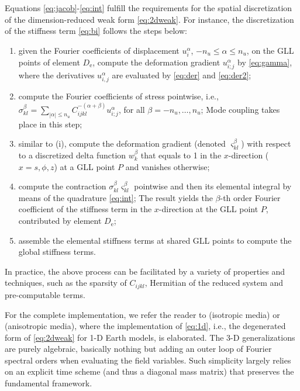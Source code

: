\documentclass[extra]{gji}
\begin{document}
Equations \eqref{eq:jacob}-\eqref{eq:int} fulfill
the requirements for the spatial discretization of the 
dimension-reduced weak form \eqref{eq:2dweak}. 
For instance, the discretization of the stiffness term \eqref{eq:bi} 
follows the steps below:
\begin{enumerate}
  \item given the Fourier coefficients of displacement 
  $u_i^\alpha$, $-n_u\le\alpha\le n_u$, 
  on the GLL points of element $D_\text{e}$, compute the deformation gradient 
  $u_{i;j}^\alpha$ by \eqref{eq:gamma},
  where the derivatives $u_{i,j}^\alpha$ are evaluated 
  by \eqref{eq:der} and \eqref{eq:der2}; 
  \item compute the Fourier coefficients of stress pointwise, i.e., $\sigma_{kl}^\beta=
  \sum_{|\alpha|\le n_u}C_{ijkl}^{-\left(\alpha+\beta\right)} u_{i;j}^\alpha$, 
  for all $\beta=-n_u,\dots, n_u$; Mode coupling takes place in this step;
  \item similar to (i), compute the deformation gradient (denoted $\varsigma_{kl}^\beta$) with respect to 
  a discretized delta function $w_k^\beta$ that equals to 1 in the $x$-direction  
  ($x=s,\phi,z$) at a GLL point $P$ and vanishes otherwise; 
  \item compute the contraction $\sigma_{kl}^\beta \varsigma_{kl}^\beta$ pointwise
  and then its elemental integral by means of the quadrature \eqref{eq:int}; 
  The result yields the $\beta$-th order Fourier coefficient of the
  stiffness term in the $x$-direction at the GLL point $P$,
  contributed by element $D_\text{e}$; 
  \item assemble the elemental stiffness terms at shared GLL points to compute
  the global stiffness terms.
\end{enumerate}
In practice, the above process can be facilitated by a variety of 
properties and techniques, such as the sparsity of $C_{ijkl}$,
Hermitian of the reduced system and pre-computable terms. 

For the complete implementation, we refer the reader to \cite{nissen2007sem} 
(isotropic media) or \cite{van2014seismic} (anisotropic media),
where the implementation of \eqref{eq:1d}, i.e.,
the degenerated form of \eqref{eq:2dweak} for 1-D Earth models,
is elaborated. The 3-D generalizations are purely algebraic, basically
nothing but adding an outer loop of Fourier spectral orders when evaluating the
field variables. Such simplicity largely relies on
an explicit time scheme (and thus a diagonal mass matrix) that preserves 
the fundamental framework.  
\end{document}
